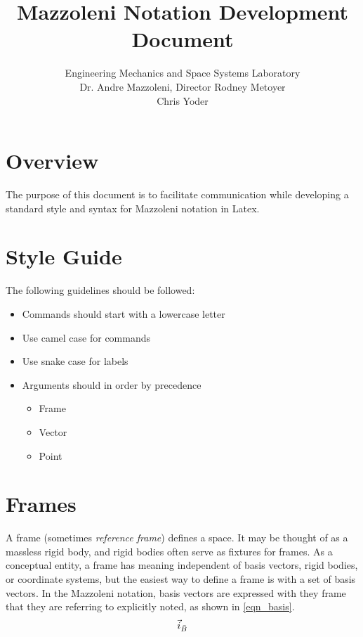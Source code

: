 \documentclass{article}
\begin{document}
	
	\title{Mazzoleni Notation Development Document}
	\author{Engineering Mechanics and Space Systems Laboratory\\
	Dr. Andre Mazzoleni, Director
	Rodney Metoyer\\
	Chris Yoder}
	
	\maketitle
	
	\section{Overview}
	The purpose of this document is to facilitate communication while developing a standard style and syntax for Mazzoleni notation in Latex.
	
	\section{Style Guide}
	The following guidelines should be followed:
	\begin{itemize}
		\item Commands should start with a lowercase letter
		\item Use camel case for commands
		\item Use snake case for labels
		\item Arguments should in order by precedence
			\begin{itemize}
				\item Frame
				\item Vector
				\item Point
			\end{itemize}
	\end{itemize}
		
	\section{Frames}
	A frame (sometimes \textit{reference frame}) defines a space. It may be thought of as a massless rigid body, and rigid bodies often serve as fixtures for frames. As a conceptual entity, a frame has meaning independent of basis vectors, rigid bodies, or coordinate systems, but the easiest way to define a frame is with a set of basis vectors. In the Mazzoleni notation, basis vectors are expressed with they frame that they are referring to explicitly noted, as shown in \ref{eqn_basis}.
	\begin{equation}
	\label{eqn_basis}
	\vec{i}_{\bar{B}}
	\end{equation}
	
\end{document}
